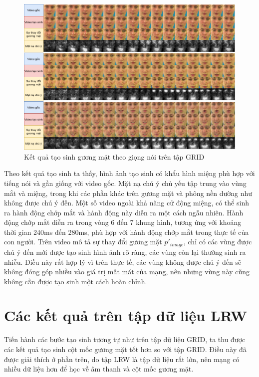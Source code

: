 \begin{figure}[H]
    \centering
    \includegraphics[width=15cm]{./content/materials/grid_examples-face.png}
    \caption{Kết quả tạo sinh gương mặt theo giọng nói trên tập GRID}
\end{figure}

Theo kết quả tạo sinh ta thấy, hình ảnh tạo sinh có khẩu hình miệng phù hợp với tiếng nói và gần giống với video gốc. Mặt nạ chú ý chủ yếu tập trung vào vùng mắt và miệng, trong khi các phần khác trên gương mặt và phông nền dường như không được chú ý đến. Một số video ngoài khả năng cử động miệng, có thể sinh ra hành động chớp mắt và hành động này diễn ra một cách ngẫu nhiên. Hành động chớp mắt diễn ra trong vòng 6 đến 7 khung hình, tương ứng với khoảng thời gian 240ms đến 280ms, phù hợp với hành động chớp mắt trong thực tế của con người. Trên video mô tả sự thay đổi gương mặt $p'_{image}$, chỉ có các vùng được chú ý đến mới được tạo sinh hình ảnh rõ ràng, các vùng còn lại thường sinh ra nhiễu. Điều này rất hợp lý vì trên thực tế, các vùng không được chú ý đến sẽ không đóng góp nhiều vào giá trị mất mát của mạng, nên những vùng này cũng không cần được tạo sinh một cách hoàn chỉnh.

\section{Các kết quả trên tập dữ liệu LRW}
Tiến hành các bước tạo sinh tương tự như trên tập dữ liệu GRID, ta thu được các kết quả tạo sinh cột mốc gương mặt tốt hơn so với tập GRID. Điều này đã được giải thích ở phần trên, do tập LRW là tập dữ liệu rất lớn, nên mạng có nhiều dữ liệu hơn để học về âm thanh và cột mốc gương mặt.


